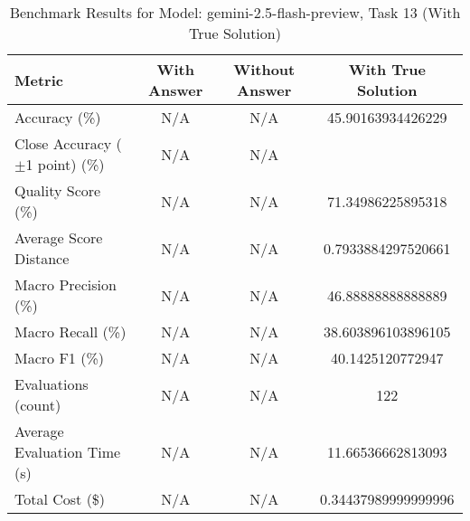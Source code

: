 \begin{table}[htbp]
\centering
\caption{Benchmark Results for Model: gemini-2.5-flash-preview, Task 13 (With True Solution)}
\begin{tabular}{lccc}
\toprule
\textbf{Metric} & \textbf{With Answer} & \textbf{Without Answer} & \textbf{With True Solution} \\
\midrule
Accuracy (\%) & N/A & N/A & 45.90163934426229 \\
Close Accuracy ($\pm$1 point) (\%) & N/A & N/A \\
Quality Score (\%) & N/A & N/A & 71.34986225895318 \\
Average Score Distance & N/A & N/A & 0.7933884297520661 \\
Macro Precision (\%) & N/A & N/A & 46.88888888888889 \\
Macro Recall (\%) & N/A & N/A & 38.603896103896105 \\
Macro F1 (\%) & N/A & N/A & 40.1425120772947 \\
Evaluations (count) & N/A & N/A & 122 \\
Average Evaluation Time (s) & N/A & N/A & 11.66536662813093 \\
Total Cost (\$) & N/A & N/A & 0.34437989999999996 \\
\bottomrule
\end{tabular}
\end{table}